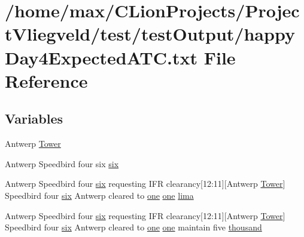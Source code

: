 \hypertarget{happyDay4ExpectedATC_8txt}{}\section{/home/max/\+C\+Lion\+Projects/\+Project\+Vliegveld/test/test\+Output/happy\+Day4\+Expected\+A\+TC.txt File Reference}
\label{happyDay4ExpectedATC_8txt}
\subsection*{Variables}
\begin{DoxyCompactItemize}
\item 
Antwerp \hyperlink{happyDay4ExpectedATC_8txt_a89eefcb2eadbbad8e4779c0d5874f895}{Tower}
\item 
Antwerp Speedbird four six \hyperlink{happyDay4ExpectedATC_8txt_a3279acb4484698e3b3b90d6a4e9c0c32}{six}
\item 
Antwerp Speedbird four \hyperlink{happyDay5ExpectedATC_8txt_a57978282a95204080c8ffb626c7d0bd5}{six} requesting I\+FR clearancy\mbox{[}12\+:11\mbox{]}\mbox{[}Antwerp \hyperlink{test_2testOutput_2log_8txt_ade5c2a9317c664c53d015e41bdc32393}{Tower}\mbox{]} Speedbird four \hyperlink{happyDay5ExpectedATC_8txt_a57978282a95204080c8ffb626c7d0bd5}{six} Antwerp cleared to \hyperlink{happyDay5ExpectedATC_8txt_a1bdf675837626f29e859d1a241701d26}{one} \hyperlink{happyDay5ExpectedATC_8txt_a1bdf675837626f29e859d1a241701d26}{one} \hyperlink{happyDay4ExpectedATC_8txt_abc10fad7597c191bcd8586b1cddb7835}{lima}
\item 
Antwerp Speedbird four \hyperlink{happyDay5ExpectedATC_8txt_a57978282a95204080c8ffb626c7d0bd5}{six} requesting I\+FR clearancy\mbox{[}12\+:11\mbox{]}\mbox{[}Antwerp \hyperlink{test_2testOutput_2log_8txt_ade5c2a9317c664c53d015e41bdc32393}{Tower}\mbox{]} Speedbird four \hyperlink{happyDay5ExpectedATC_8txt_a57978282a95204080c8ffb626c7d0bd5}{six} Antwerp cleared to \hyperlink{happyDay5ExpectedATC_8txt_a1bdf675837626f29e859d1a241701d26}{one} \hyperlink{happyDay5ExpectedATC_8txt_a1bdf675837626f29e859d1a241701d26}{one} maintain five \hyperlink{happyDay4ExpectedATC_8txt_a429913a0643fe14faca3dca538caa7bb}{thousand}
\item 

\end{DoxyCompactItemize}
